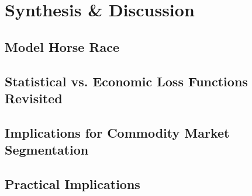 
\section{Synthesis \& Discussion}
\subsection{Model Horse Race}
\subsection{Statistical vs. Economic Loss Functions Revisited}
\subsection{Implications for Commodity Market Segmentation}
\subsection{Practical Implications}